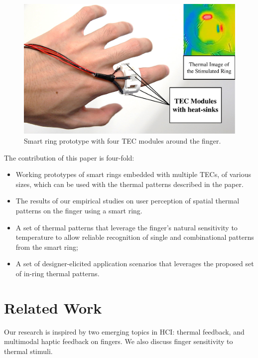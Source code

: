 \documentclass[preprint,12pt]{elsarticle}
\begin{document}
\begin{figure}[tp]
  \centering
  \includegraphics[width=0.8\columnwidth]{img/fig1.pdf}
  \caption{Smart ring prototype with four TEC modules around the finger.}
  \label{fig:1}
\end{figure}

The contribution of this paper is four-fold:

\begin{itemize}
\item Working prototypes of smart rings embedded with multiple TECs, of various sizes, which can be used with the thermal patterns described in the paper.
\item The results of our empirical studies on user perception of spatial thermal patterns on the finger using a smart ring.
\item A set of thermal patterns that leverage the finger's natural sensitivity to temperature to allow reliable recognition of single and combinational patterns from the smart ring;
\item A set of designer-elicited application scenarios that leverages the proposed set of in-ring thermal patterns.%
\end{itemize}

\section{Related Work}
Our research is inspired by two emerging topics in HCI: thermal feedback, and multimodal haptic feedback on fingers. We also discuss finger sensitivity to thermal stimuli.
\end{document}
